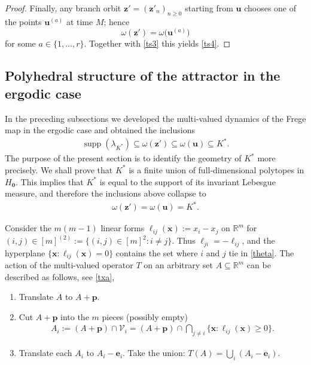 \documentclass[11pt,reqno,tbtags,a4paper]{amsart}
\numberwithin{equation}{section}
\renewcommand\ge{\geq}
\renewcommand\geq{\geqslant}
\theoremstyle{plain}%
\theoremstyle{definition}
\theoremstyle{remark}
\newcommand\set[1]{\ensuremath{\{#1\}}}
\newcommand\bbR{\mathbb R}
\newcommand\supp{\operatorname{supp}}
\newcommand\gl{\lambda}
\newcommand\cL{{\omega}}
\newcommand\cV{\mathcal V}
\newcommand\Ho{H_{\0}}
\newcommand\ve{\mathbf{e}}
\newcommand\vp{\mathbf{p}}
\newcommand\vu{\mathbf{u}}
\newcommand\vx{\mathbf{x}}
\newcommand\vz{\mathbf{z}}
\newcommand\Kx{K^*}
\newcommand\mmx{[m]^{(2)}}
\newcommand\0{{\boldsymbol 0}}
\newcommand\1{{\boldsymbol 1}}
\begin{document}
\begin{proof}
Finally, any branch orbit $\vz'=(\vz'_n)_{n\ge0}$ starting from $\vu$ chooses
one of the points $\vu^{(a)}$ at time $M$; hence
\begin{equation}\label{ts15}
\omega(\vz')=\omega\bigl(\vu^{(a)}\bigr)
\end{equation}
for some $a\in\{1,\dots,r\}$. Together with \eqref{ts3} this yields
\eqref{ts4}.
\end{proof}


\subsection{Polyhedral structure of the attractor in the ergodic case}\label{Spoly}

In the preceding subsections we developed the multi-valued dynamics of the
Frege map in the ergodic case and obtained the inclusions
\begin{align}
\supp(\gl_{\Kx})\subseteq \omega(\vz')\subseteq \cL(\vu)\subseteq \Kx.  
\end{align}
The purpose of the present section is to identify the geometry of $\Kx$ more
precisely. We shall prove that $\Kx$ is a finite union of full-dimensional
polytopes in $\Ho$. This implies that $\Kx$ is equal to the support of its
invariant Lebesgue measure, and therefore the inclusions above collapse to
\begin{align}
\omega(\vz')=\cL(\vu)=\Kx.  
\end{align}

Consider the $m(m-1)$ linear forms $\ell_{ij}(\vx):=x_i-x_j$ on $\bbR^m$
for $(i,j)\in\mmx:=\set{(i,j)\in[m]^2:i\neq j}$.
Thus $\ell_{ji}=-\ell_{ij}$, and
%
the hyperplane 
$\set{\vx:\ell_{ij}(\vx)=0}$
contains the set where $i$ and $j$ tie in
\eqref{theta}. The action of the multi-valued operator $T$ on an arbitrary 
set $A\subseteq\bbR^m$ can be described as follows, see \eqref{txa},
\begin{enumerate}
 \renewcommand{\labelenumi}{\textup{(A\arabic{enumi})}}%
 \renewcommand{\theenumi}{\labelenumi}%
\item\label{TA1} 
Translate $A$ to $A+\vp$.
\item\label{TA2} 
Cut $A+\vp$ into the $m$ pieces (possibly empty)
  \begin{align}\label{ta2}
A_i:=(A+\vp)\cap \cV_i =(A+\vp)\cap\bigcap_{j\neq i} \set{\vx:\ell_{ij}(\vx)\ge0}  
 . \end{align}
\item \label{TA3}
Translate each $A_i$ to $A_i-\ve_i$. 
Take the union: $T(A)=\bigcup_i(A_i-\ve_i)$.
\end{enumerate}
\end{document}
